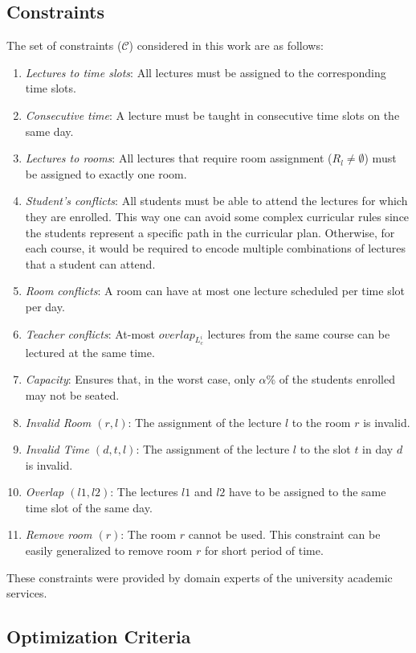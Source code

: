 \documentclass[twocolumn,natbib]{svjour3}          %
\newcounter{constraint}
\begin{document}
\subsection{Constraints}

The set of constraints ($\mathcal{C}$) considered in this work are as follows:
\begin{enumerate}
	\item 
	{\em Lectures to time slots}: All lectures must be assigned to the corresponding time slots.
	\item {\em Consecutive time}: A lecture must be taught in consecutive time slots on the same day. 
	\item {\em Lectures to rooms}: All lectures that require room assignment ($R_l \neq \emptyset$) must be assigned to exactly one room.
	\item {\em Student's conflicts}: All students must be able to attend the lectures for which they are enrolled. This way one can avoid some complex curricular rules since the students represent a specific path in the curricular plan. Otherwise, for each course, it would be required to encode multiple combinations of lectures that a student can attend. 
	\item {\em Room conflicts}: A room can have at most one lecture scheduled per time slot per day.
	\item {\em Teacher conflicts}: At-most $overlap_{L_c^{i}}$ lectures from the same course can be lectured at the same time. 
	\item {\em Capacity}: Ensures that, in the worst case, only $\alpha$\% of the students enrolled may not be seated. 
	\item {\em Invalid Room $(r,l)$}: The assignment of the lecture $l$ to the room $r$ is invalid.
	\item {\em Invalid Time $(d,t,l)$}: The assignment of the lecture $l$ to the slot $t$ in day $d$ is invalid.
	\item {\em Overlap $(l1,l2)$}: The lectures $l1$ and $l2$ have to be assigned to the same time slot of the same day.
	\item {\em Remove room $(r)$}: The room $r$ cannot be used. This constraint can be easily generalized to remove room $r$ for short period of time.  
\end{enumerate}

These constraints were provided  by domain experts of the university academic services. 

\subsection{Optimization Criteria}
\end{document}
